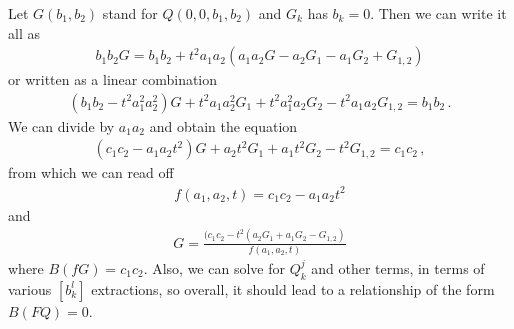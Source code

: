 Let $G(b_1,b_2)$ stand for $Q(0,0,b_1,b_2)$ and $G_k$ has $b_k = 0$. Then we can write it all as
\begin{align}
	b_1b_2 G = b_1b_2 + t^2a_1a_2(a_1a_2G-a_2G_1-a_1G_2+G_{1,2})
\end{align}
or written as a linear combination
\begin{align}
	(b_1b_2-t^2a_1^2a_2^2)G+t^2a_1a_2^2G_1 + t^2a_1^2a_2G_2 - t^2a_1a_2G_{1,2} = b_1b_2\,.
\end{align}
We can divide by $a_1a_2$ and obtain the equation
\begin{align}
	(c_1c_2-a_1a_2t^2)G + a_2t^2G_1+a_1t^2G_2-t^2G_{1,2}=c_1c_2\,,
\end{align}
from which we can read off
\begin{align}
	f(a_1,a_2,t) = c_1c_2-a_1a_2t^2
\end{align}
and
\begin{align}
	G = \frac{(c_1c_2-t^2(a_2G_1+a_1G_2-G_{1,2})}{f(a_1,a_2,t)}
\end{align}
where $B(fG) = c_1c_2$. Also, we can solve for $Q_k^j$ and other terms, in terms of various $[b_k^l]$ extractions, so overall, it should lead to a relationship of the form $B(FQ) = 0$.

